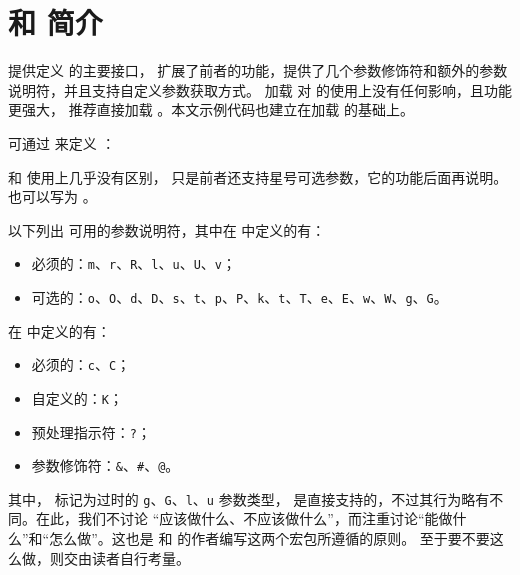 \documentclass[openany]{book}
\begin{document}
\section{ 和  简介}

 提供定义  的主要接口，
扩展了前者的功能，提供了几个参数修饰符和额外的参数说明符，并且支持自定义参数获取方式。
加载  对  的使用上没有任何影响，且功能更强大，
推荐直接加载 。本文示例代码也建立在加载  的基础上。

可通过  来定义 ：
\begin{syntax}
  \V\DeclareEKeysCommand   {}  
  \V\DeclareEKeysCommand *   
\end{syntax}
 和  使用上几乎没有区别，
只是前者还支持星号可选参数，它的功能后面再说明。
 也可以写为 。

以下列出  可用的参数说明符，其中在  中定义的有：
\begin{itemize}
  \item 必须的：\texttt m、\texttt r、\texttt R、\texttt l、\texttt u、\texttt U、\texttt v；
  \item 可选的：\texttt o、\texttt O、\texttt d、\texttt D、\texttt s、\texttt t、\texttt p、\texttt P、\texttt k、\texttt t、\texttt T、\texttt e、\texttt E、\texttt w、\texttt W、\texttt g、\texttt G。
\end{itemize}
在  中定义的有：
\begin{itemize}
  \item 必须的：\texttt c、\texttt C；
  \item 自定义的：\texttt K；
  \item 预处理指示符：\texttt ?；
  \item 参数修饰符：\texttt\&、\texttt\#、\texttt @。
\end{itemize}

其中， 标记为过时的 \texttt g、\texttt G、\texttt l、\texttt u 
参数类型， 是直接支持的，不过其行为略有不同。在此，我们不讨论
“应该做什么、不应该做什么”，而注重讨论“能做什么”和“怎么做”。这也是 
 和  的作者编写这两个宏包所遵循的原则。
至于要不要这么做，则交由读者自行考量。
\end{document}
